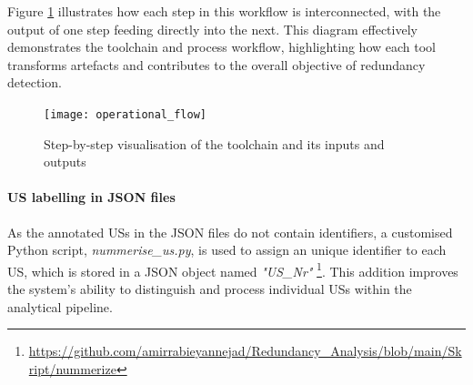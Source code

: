 Figure \ref{fig:operational_flow} illustrates how each step in this workflow is interconnected, with the output of one step feeding directly into the next. This diagram effectively demonstrates the toolchain and process workflow, highlighting how each tool transforms artefacts and contributes to the overall objective of redundancy detection.
\begin{figure}[h]
	\centering 
	\texttt{[image: operational\_flow]}
	\caption{Step-by-step visualisation of the toolchain and its inputs and outputs}\label{fig:operational_flow}
\end{figure}
\paragraph{US labelling in JSON files}\label{workflow_nummerize_us}
As the annotated USs in the JSON files do not contain identifiers, a customised Python script, \textit{nummerise\_us.py}, is used to assign an unique identifier to each US, which is stored in a JSON object named \textit{"US\_Nr"} \footnote{\href{https://github.com/amirrabieyannejad/Redundancy_Analysis/blob/main/Skript/nummerize_us/nummerize_us.py}{https://github.com/amirrabieyannejad/Redundancy\_Analysis/blob/main/Skript/nummerize}}. This addition improves the system's ability to distinguish and process individual USs within the analytical pipeline.

